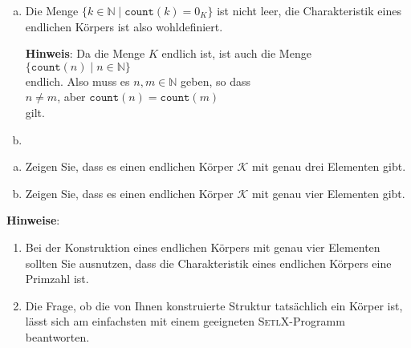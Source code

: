 \begin{enumerate}[(a)]
\item Die Menge $\bigl\{ k \in \mathbb{N} \mid \mathtt{count}(k) = 0_K \bigr \}$
      ist nicht leer, die Charakteristik eines endlichen K\"{o}rpers ist also wohldefiniert.

      \noindent
      \textbf{Hinweis}:
      Da die Menge $K$ endlich ist, ist auch die Menge
      \\[0.2cm]
      \hspace*{1.3cm}
      $\{ \mathtt{count}(n) \mid n \in \mathbb{N} \}$
      \\[0.2cm]
      endlich.  Also muss es $n, m \in \mathbb{N}$ geben, so dass
      \\[0.2cm]
      \hspace*{1.3cm}
      $n \not= m$, \quad aber \quad $\mathtt{count}(n) = \mathtt{count}(m)$
      \\[0.2cm]
      gilt.
\item \colorbox{red}{} \eoxs
\end{enumerate}

\exercise
\begin{enumerate}[(a)]
\item Zeigen Sie, dass es einen endlichen K\"{o}rper $\mathcal{K}$ mit genau drei Elementen gibt.
\item Zeigen Sie, dass es einen endlichen K\"{o}rper $\mathcal{K}$ mit genau vier Elementen gibt. 
\end{enumerate}
\textbf{Hinweise}:
\begin{enumerate}
\item Bei der Konstruktion eines endlichen K\"{o}rpers mit genau vier Elementen sollten Sie ausnutzen,
      dass die Charakteristik eines endlichen K\"{o}rpers eine Primzahl ist.
\item Die Frage, ob die von Ihnen konstruierte Struktur tats\"{a}chlich ein K\"{o}rper ist, l\"{a}sst sich am
      einfachsten mit einem geeigneten \textsc{SetlX}-Programm beantworten.
      \eoxs
\end{enumerate}


